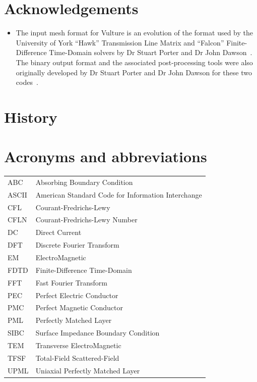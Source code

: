 \documentclass[onecolumn,a4paper]{article}
\numberwithin{equation}{section}
\begin{document}
\section*{Acknowledgements}

\begin{itemize}
 \item The input mesh format for Vulture is an evolution of the format used by
 the University of York ``Hawk'' Transmission Line Matrix and ``Falcon'' Finite-Difference
 Time-Domain solvers by Dr Stuart Porter and Dr John Dawson~\cite{hawkman,falconman}. The binary output format and 
 the associated post-processing tools were also originally developed by
 Dr Stuart Porter and Dr John Dawson for these two codes~\cite{procman}. 

\end{itemize}

\section*{History}

%
%
%
\newpage
%
\tableofcontents
%
\newpage
%
%
\section*{Acronyms and abbreviations}
\pagestyle{fancy}
%
%
{\large
\begin{tabular}{l@{\hspace{15mm}}l}
  ABC        &Absorbing Boundary Condition \\
  ASCII      &American Standard Code for Information Interchange \\
  CFL        &Courant-Fredrichs-Lewy \\
  CFLN       &Courant-Fredrichs-Lewy Number \\
  DC         &Direct Current \\
  DFT        &Discrete Fourier Transform \\
  EM         &ElectroMagnetic \\
  FDTD       &Finite-Difference Time-Domain \\
  FFT        &Fast Fourier Transform \\
  PEC        &Perfect Electric Conductor \\
  PMC        &Perfect Magnetic Conductor \\
  PML        &Perfectly Matched Layer \\
  SIBC       &Surface Impedance Boundary Condition \\
  TEM        &Transverse ElectroMagnetic \\
  TFSF       &Total-Field Scattered-Field \\
  UPML       &Uniaxial Perfectly Matched Layer
\end{tabular}
}%
%
%
%
\newpage
%
%
\end{document}
